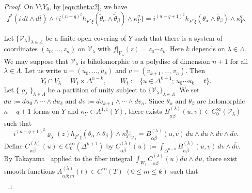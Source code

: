 \documentclass[amscd, leqno]{amsart}
\theoremstyle{plain}
\theoremstyle{definition}
\theoremstyle{remark}
\newenvironment{pf}{\begin{proof}}{\end{proof}}
\begin{document}
\begin{pf}
On $Y\setminus Y_{0}$, by \eqref{eqn:theta:2}, we have
\begin{equation}
\label{eqn:rel:diff:form}
f^{*}(i\,dt\wedge d\bar{t}) \wedge \{i^{(n-q)^{2}}h_{F^{*}{\xi}}(\widetilde{\theta}_{\alpha}\wedge\overline{\widetilde{\theta}}_{\beta}) 
\wedge \kappa_{Y}^{q}\}
=
i^{(n-q+1)^{2}}h_{F^{*}{\xi}}(\theta_{\alpha}\wedge\overline{\theta}_{\beta}) \wedge \kappa_{Y}^{q}.
\end{equation}
\par
Let $\{{\mathcal V}_{\lambda}\}_{\lambda\in\Lambda}$ be a finite open covering of $Y$ such that there is a system of coordinates 
$(z_{0},\ldots,z_{n})$ on ${\mathcal V}_{\lambda}$ with $f|_{{\mathcal V}_{\lambda}}(z)=z_{0}\cdots z_{k}$. 
Here $k$ depends on $\lambda\in\Lambda$.
We may suppose that ${\mathcal V}_{\lambda}$ is biholomorphic to a polydisc of dimension $n+1$ for all $\lambda \in \Lambda$. 
Let us write $u=(u_{0}, \ldots, u_{k})$ and $v=(v_{k+1}, \ldots, v_{n})$.
Then 
$$
Y_{t}\cap V_{\lambda} = W_{t} \times \varDelta^{n-k},
\qquad
W_{t} := \{ u \in \varDelta^{k+1} ;\, u_{0} \cdots u_{k} =t \} .
$$
Let $\{\varrho_{\lambda}\}_{\lambda\in\Lambda}$ be a partition of unity subject to $\{{\mathcal V}_{\lambda}\}_{\lambda\in\Lambda}$.
We set $du := du_{0}\wedge \cdots \wedge du_{k}$ and $dv := dv_{k+1}\wedge \cdots \wedge dv_{n}$. 
Since $\theta_{\alpha}$ and $\theta_{\beta}$ are holomorphic $n-q+1$-forms on $Y$ and $\kappa_{Y}\in A^{1,1}(Y)$,
there exists $B_{\alpha\bar{\beta}}^{(\lambda)}(u,v)\in C^{\infty}_{0}({\mathcal V}_{\lambda})$ such that
\begin{equation}
\label{eqn:rel:diff:form:2}
i^{(n-q+1)^{2}}
\varrho_{\lambda}(z) h_{F^{*}{\xi}}( \theta_{\alpha} \wedge \overline{\theta}_{\beta} ) \wedge \kappa_{Y}^{q} |_{{\mathcal V}_{\lambda}}
=
B_{\alpha\bar{\beta}}^{(\lambda)}(u,v)\,du\wedge \overline{du} \wedge dv \wedge \overline{dv}.
\end{equation}
Define $C_{\alpha\bar{\beta}}^{(\lambda)}(u) \in C^{\infty}_{0}( \varDelta^{k+1})$ by 
$C_{\alpha\bar{\beta}}^{(\lambda)}(u) := \int_{\varDelta^{n-k}} B_{\alpha\bar{\beta}}^{(\lambda)}(u,v)\,dv\wedge \overline{dv}$.
By Takayama~\cite[Proof of Prop.\,6.1]{Takayama22} applied to the fiber integral 
$\int_{W_{t}} C_{\alpha\bar{\beta}}^{(\lambda)}(u) du\wedge \overline{du}$, there exist smooth functions 
$A_{\alpha\bar{\beta};m}^{(\lambda)}(t) \in C^{\infty}(T)$ $(0 \leq m \leq k)$ such that
\begin{equation}
\label{eqn:asym:exp:fib:int1}
\begin{aligned}

\end{aligned}
\end{equation}
\end{pf}
\end{document}
